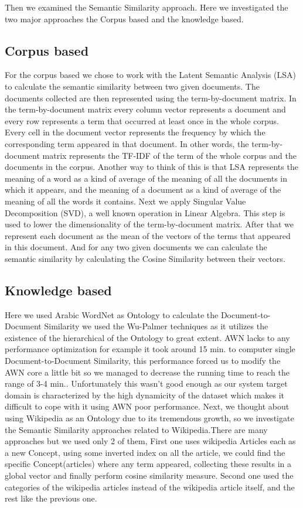 Then we examined the Semantic Similarity approach. Here we investigated the two major approaches the Corpus based and the knowledge based.

\subsection{Corpus based}
For the corpus based we chose to work with the Latent Semantic Analysis (LSA) to calculate the semantic similarity between two given documents. The documents collected are then represented using the term-by-document matrix. In the term-by-document matrix every column vector represents a document and every row represents a term that occurred at least once in the whole corpus. Every cell in the document vector represents the frequency by which the corresponding term appeared in that document. In other words, the term-by-document matrix represents the TF-IDF of the term of the whole corpus and the documents in the corpus. Another way to think of this is that LSA represents the meaning of a word as a kind of average of the meaning of all the documents in which it appears, and the meaning of a document as a kind of average of the meaning of all the words it contains.
Next we apply Singular Value Decomposition (SVD), a well known operation in Linear Algebra. This step is used to lower the dimensionality of the term-by-document matrix.
After that we represent each document as the mean of the vectors of the terms that appeared in this document. And for any two given documents we can calculate the semantic similarity by calculating the Cosine Similarity between their vectors.

\subsection{Knowledge based}
Here we used Arabic WordNet as Ontology to calculate the Document-to-Document Similarity we used the Wu-Palmer techniques as it utilizes the existence of the hierarchical of the Ontology to great extent.
AWN lacks to any performance optimization for example it took around 15 min. to computer single Document-to-Document Similarity, this performance forced us to modify the AWN core a little bit so we managed to decrease the running time to reach the range of 3-4 min.. Unfortunately this wasn’t good enough as our system target domain is characterized by the high dynamicity of the dataset which makes it difficult to cope with it using AWN poor performance.
Next, we thought about using Wikipedia as an Ontology due to its tremendous growth, so we investigate the Semantic Similarity approaches related to Wikipedia.There are many approaches but we used only 2 of them, First one uses wikipedia Articles each as a new Concept, using some inverted index on all the article, we could find the specific Concept(articles) where any term appeared, collecting these results in a global vector and finally perform cosine similarity measure.
Second one used the categories of the wikipedia articles instead of the wikipedia article itself, and the rest like the previous one.


